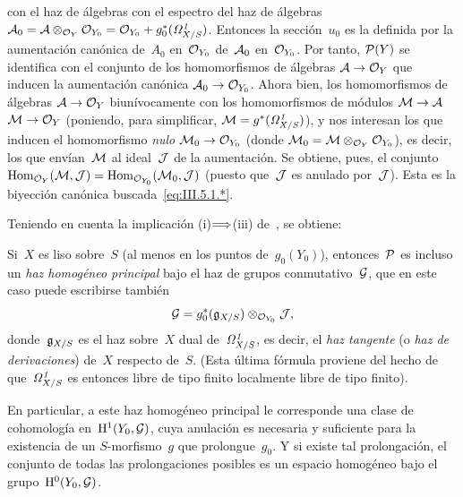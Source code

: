 {con el haz de álgebras}
{con el espectro del haz de álgebras}
$\cal{A}_0=\cal{A}\otimes_{\cal{O}_Y}\cal{O}_{Y_0}=\cal{O}_{Y_0}+g_0^*(\it{\Omega}^1_{X/S})$.
Entonces la sección~$u_0$ es la definida por la aumentación canónica
{de~$A_0$ en~$\cal{O}_{Y_0}$}
{de~$\cal{A}_0$ en~$\cal{O}_{Y_0}$}.
Por tanto, $\cal{P}(Y)$ se identifica con el conjunto de los homomorfismos de álgebras $\cal{A}\to\cal{O}_Y$ que inducen la aumentación canónica $\cal{A}_0\to\cal{O}_{Y_0}$. Ahora bien, los homomorfismos de álgebras $\cal{A}\to\cal{O}_Y$
biunívocamente con los homomorfismos de módulos
{$\cal{M}\to\cal{A}$}
{$\cal{M}\to\cal{O}_Y$}
(poniendo, para simplificar, $\cal{M}=g^*(\it{\Omega}^1_{X/S})$), y nos interesan los que inducen el homomorfismo \emph{nulo} $\cal{M}_0\to\cal{O}_{Y_0}$ (donde $\cal{M}_0=\cal{M}\otimes_{\cal{O}_Y}\cal{O}_{Y_0}$), es decir, los que envían~$\cal{M}$ al ideal~$\cal{J}$ de la aumentación. Se obtiene, pues, el conjunto $\Hom_{\cal{O}_Y}(\cal{M},\cal{J})=\Hom_{\cal{O}_{Y_0}}(\cal{M}_0,\cal{J})$
(puesto que~$\cal{J}$ es anulado por~$\cal{J}$). Esta es la biyección canónica buscada~\eqref{eq:III.5.1.*}.

Teniendo en cuenta la implicación (i)$\To$(iii) de~, se obtiene:

\begin{corollaire}
\label{III.5.2}
Si~$X$ es liso sobre~$S$ (al menos en los puntos de~$g_0(Y_0)$), entonces~$\cal{P}$ es incluso un \emph{haz homogéneo principal} bajo el haz de grupos conmutativo~$\cal{G}$, que en este caso puede escribirse también
\begin{equation*}
\cal{G}=g_0^*(\goth{g}_{X/S})\otimes_{\cal{O}_{Y_0}}\cal{J},
\end{equation*}
donde~$\goth{g}_{X/S}$
\label{indnot:cb}%
es el haz sobre~$X$ dual de~$\it{\Omega}_{X/S}^1$, es decir, el \emph{haz tangente}
%
%
(o \emph{haz de derivaciones})
%
%
de~$X$ respecto de~$S$. (Esta última fórmula proviene del hecho de que~$\it{\Omega}_{X/S}^1$ es entonces
{libre de tipo finito}
{localmente libre de tipo finito}).
\end{corollaire}

En particular, a este haz homogéneo principal le corresponde una clase de cohomología en~$\H^1(Y_0,\cal{G})$, cuya anulación es necesaria y suficiente para la existencia de un $S$-morfismo~$g$ que prolongue~$g_0$. Y si existe tal prolongación, el conjunto de todas las prolongaciones posibles es un espacio homogéneo bajo el grupo~$\H^0(Y_0,\cal{G})$.
